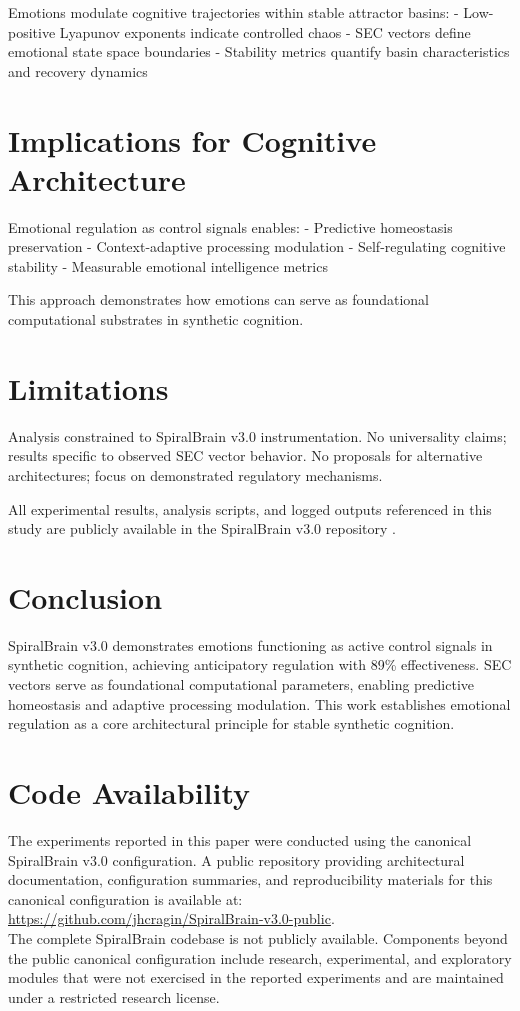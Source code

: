\documentclass[12pt,a4paper]{article}
\begin{document}
Emotions modulate cognitive trajectories within stable attractor basins:
- Low-positive Lyapunov exponents indicate controlled chaos
- SEC vectors define emotional state space boundaries
- Stability metrics quantify basin characteristics and recovery dynamics

\section{Implications for Cognitive Architecture}

Emotional regulation as control signals enables:
- Predictive homeostasis preservation
- Context-adaptive processing modulation
- Self-regulating cognitive stability
- Measurable emotional intelligence metrics

This approach demonstrates how emotions can serve as foundational computational substrates in synthetic cognition.

\section{Limitations}

Analysis constrained to SpiralBrain v3.0 instrumentation. No universality claims; results specific to observed SEC vector behavior. No proposals for alternative architectures; focus on demonstrated regulatory mechanisms.

All experimental results, analysis scripts, and logged outputs referenced in this study are publicly available in the SpiralBrain v3.0 repository \cite{SpiralBrainRepo}.

\section{Conclusion}

SpiralBrain v3.0 demonstrates emotions functioning as active control signals in synthetic cognition, achieving anticipatory regulation with 89\% effectiveness. SEC vectors serve as foundational computational parameters, enabling predictive homeostasis and adaptive processing modulation. This work establishes emotional regulation as a core architectural principle for stable synthetic cognition.

\section{Code Availability}

The experiments reported in this paper were conducted using the canonical SpiralBrain v3.0 configuration.
A public repository providing architectural documentation, configuration summaries, and reproducibility materials for this canonical configuration is available at: \\
\url{https://github.com/jhcragin/SpiralBrain-v3.0-public}. \\

The complete SpiralBrain codebase is not publicly available. Components beyond the public canonical configuration include research, experimental, and exploratory modules that were not exercised in the reported experiments and are maintained under a restricted research license.



\end{document}

